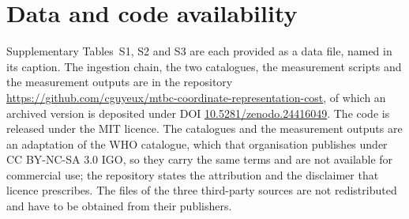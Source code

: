 \documentclass[11pt]{article}
\begin{document}
\section{Data and code availability}
Supplementary Tables~S1, S2 and S3 are each provided as a data file, named in its caption.
The ingestion chain, the two catalogues, the measurement scripts and the measurement outputs are
in the repository \url{https://github.com/cguyeux/mtbc-coordinate-representation-cost}, of which
an archived version is deposited under DOI
\href{https://doi.org/10.5281/zenodo.24416049}{10.5281/zenodo.24416049}. The code is released
under the MIT licence. The catalogues and the measurement outputs are an adaptation of the WHO
catalogue, which that organisation publishes under CC BY-NC-SA 3.0 IGO, so they carry the same
terms and are not available for commercial use; the repository states the attribution and the
disclaimer that licence prescribes. The files of the three third-party sources are not
redistributed and have to be obtained from their publishers.



\end{document}
